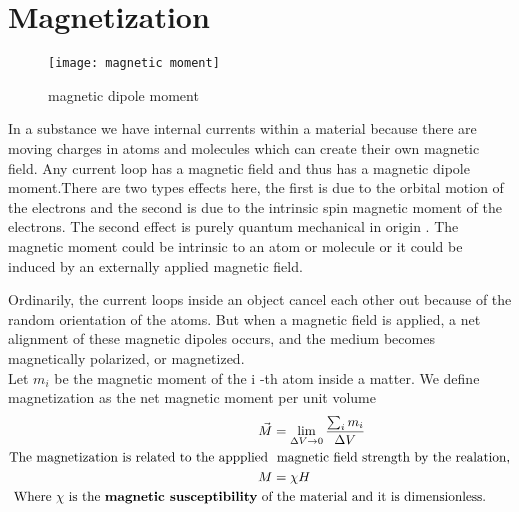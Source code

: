 \section{Magnetization}
\begin{wrapfigure}{r}{0.3\textwidth}
	\begin{center}
		\texttt{[image: magnetic moment]}
	\end{center}
	\caption{magnetic dipole moment}
\end{wrapfigure}
In a substance we have internal currents within a material because there are moving charges in atoms and molecules which can create their own magnetic field. Any current loop has a magnetic field and thus has a magnetic dipole moment.There are two types effects here, the first is due to the orbital motion of the electrons and the second is due to the intrinsic spin magnetic moment of the electrons. The second effect is purely quantum mechanical in origin . The magnetic moment could be intrinsic to an atom or molecule or it could be induced by an externally applied magnetic field. \par
Ordinarily, the current loops inside an object cancel each other out because of the random orientation of the atoms. But when a magnetic field is applied, a net alignment of these magnetic dipoles occurs, and the medium becomes magnetically polarized, or magnetized.
\\
Let ${m_{i}}$ be the magnetic moment of the $\mathrm{i}$ -th atom inside a matter. We define magnetization as the net magnetic moment per unit volume
\begin{align*}
\vec{M}&=\lim _{\Delta V \rightarrow 0} \frac{\sum_{i} {m_{i}}}{\Delta V}\\
\text{The magnetization is related to the appplied }&\text{ magnetic field strength by the realation,}\\
M&=\chi H\\
\text{Where $\chi$ is the \textbf{magnetic susceptibility} of}&\text{  the material and it is dimensionless.}
\end{align*}
